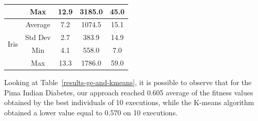 \documentclass[conference,compsoc]{IEEEtran}
\begin{document}
\begin{table}[]
\begin{tabular}{|c|c|c|c|c|}
		& Max                                      & 12.9                                                                                          & 3185.0                                                                                                          & 45.0                                                                                                \\ \hline
		\multirow{4}{*}{Iris}                  & Average                                  & 7.2                                                                                           & 1074.5                                                                                                          & 15.1                                                                                                \\ \cline{2-5} 
		& Std Dev                                  & 2.7                                                                                           & 383.9                                                                                                           & 14.9                                                                                                \\ \cline{2-5} 
		& Min                                      & 4.1                                                                                           & 558.0                                                                                                           & 7.0                                                                                                 \\ \cline{2-5} 
		& Max                                      & 13.3                                                                                          & 1786.0                                                                                                          & 59.0                                                                                                \\ \hline
	\end{tabular}
\end{table}



Looking at Table~\ref{results-ge-and-kmeans}, it is possible to observe that for the Pima Indian Diabetes, our approach reached 0.605 average of the fitness values obtained by the best individuals of 10 executions, while the K-means algorithm obtained a lower value equal to 0.570 on 10 executions.
\end{document}
